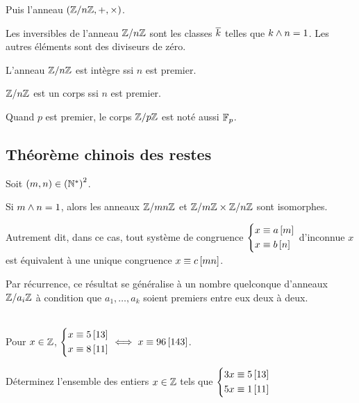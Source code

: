 Puis l'anneau \(\anneau{\znz{n}}[+][\times]\).

\begin{prop}
Les inversibles de l'anneau \(\mathbb{Z}/n\mathbb{Z}\) sont les classes \(\overline{k}\) telles que \(k\land n=1\). Les autres éléments sont des diviseurs de zéro.

L'anneau \(\mathbb{Z}/n\mathbb{Z}\) est intègre ssi \(n\) est premier.

\(\mathbb{Z}/n\mathbb{Z}\) est un corps ssi \(n\) est premier.
\end{prop}

Quand \(p\) est premier, le corps \(\mathbb{Z}/p\mathbb{Z}\) est noté aussi \(\mathbb{F}_{p}\).

\subsection{Théorème chinois des restes}

\begin{theo}
Soit \(\left(m,n\right)\in\left(\mathbb{N}^*\right)^2\).

Si \(m\land n=1\), alors les anneaux \(\mathbb{Z}/mn\mathbb{Z}\) et \(\mathbb{Z}/m\mathbb{Z}\times\mathbb{Z}/n\mathbb{Z}\) sont isomorphes.
\end{theo}

Autrement dit, dans ce cas, tout système de congruence \(\begin{dcases}
x\equiv a\left[m\right] \\
x\equiv b\left[n\right]
\end{dcases}\) d'inconnue \(x\) est équivalent à une unique congruence \(x\equiv c\left[mn\right]\).

Par récurrence, ce résultat se généralise à un nombre quelconque d'anneaux \(\mathbb{Z}/a_i\mathbb{Z}\) à condition que \(a_1,\dots,a_k\) soient premiers entre eux deux à deux.

\begin{ex}~\\
Pour \(x\in\mathbb{Z}\), \(\begin{dcases}
x\equiv5\left[13\right] \\
x\equiv8\left[11\right]
\end{dcases}\iff x\equiv96\left[143\right]\).
\end{ex}

\begin{exo}
Déterminez l'ensemble des entiers \(x\in\mathbb{Z}\) tels que \(\begin{dcases}
3x\equiv5\left[13\right] \\
5x\equiv1\left[11\right]
\end{dcases}\)
\end{exo}

